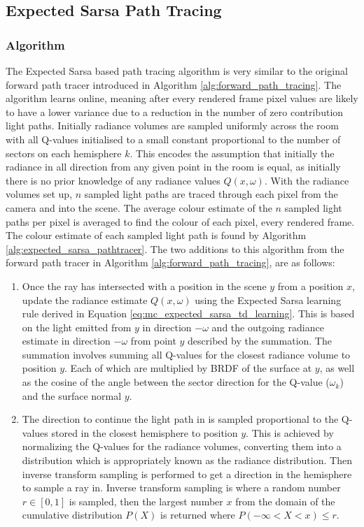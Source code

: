 \documentclass[ %
                    author={Callum Pearce},
                supervisor={Dr. Neill Campbell},
                    degree={MEng},
                     title={How effective are Temporal difference learning methods for reducing the number of zero contribution light paths, while still accurately approximating Global Illumination in Path tracing?},
                  subtitle={},
                      type={research},
                      year={2019} ]{dissertation}
\begin{document}
\subsection{Expected Sarsa Path Tracing}

\subsubsection{Algorithm}
The Expected Sarsa based path tracing algorithm is very similar to the original forward path tracer introduced in Algorithm \ref{alg:forward_path_tracing}. The algorithm learns online, meaning after every rendered frame pixel values are likely to have a lower variance due to a reduction in the number of zero contribution light paths. Initially radiance volumes are sampled uniformly across the room with all Q-values initialised to a small constant proportional to the number of sectors on each hemisphere $k$. This encodes the assumption that initially the radiance in all direction from any given point in the room is equal, as initially there is no prior knowledge of any radiance values $Q(x, \omega)$. With the radiance volumes set up, $n$ sampled light paths are traced through each pixel from the camera and into the scene. The average colour estimate of the $n$ sampled light paths per pixel is averaged to find the colour of each pixel, every rendered frame. The colour estimate of each sampled light path is found by Algorithm \ref{alg:expected_sarsa_pathtracer}. The two additions to this algorithm from the forward path tracer in Algorithm \ref{alg:forward_path_tracing}, are as follows:

\begin{enumerate}
\item Once the ray has intersected with a position in the scene $y$ from a position $x$, update the radiance estimate $Q(x, \omega)$ using the Expected Sarsa learning rule derived in Equation \ref{eq:mc_expected_sarsa_td_learning}. This is based on the light emitted from $y$ in direction $-\omega$ and the outgoing radiance estimate in direction $-\omega$ from point $y$ described by the summation. The summation involves summing all Q-values for the closest radiance volume to position $y$. Each of which are multiplied by BRDF of the surface at $y$, as well as the cosine of the angle between the sector direction for the Q-value ($\omega_k$) and the surface normal $y$.

\item The direction to continue the light path in is sampled proportional to the Q-values stored in the closest hemisphere to position $y$. This is achieved by normalizing the Q-values for the radiance volumes, converting them into a distribution which is appropriately known as the radiance distribution. Then inverse transform sampling \cite{devroye2006nonuniform} is performed to get a direction in the hemisphere to sample a ray in. Inverse transform sampling is where a random number $r \in [0,1]$ is sampled, then the largest number $x$ from the domain of the cumulative distribution $P(X)$ is returned where $ P(-\infty < X < x) \leq r$. 
\end{enumerate}
\end{document}
